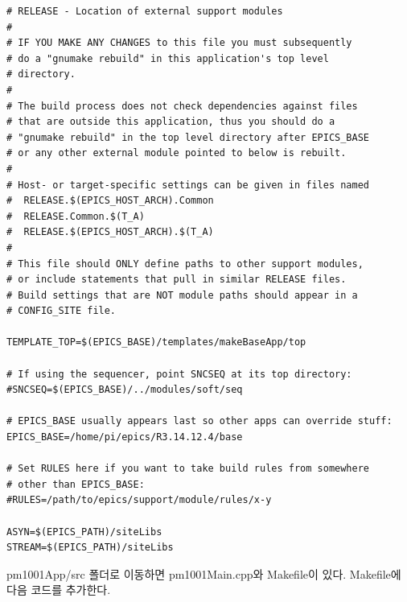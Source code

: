\documentclass[11pt
  , a4paper
  , article
  , oneside
]{memoir}
\begin{document}
\begin{lstlisting}[style=termstyle]
# RELEASE - Location of external support modules
#
# IF YOU MAKE ANY CHANGES to this file you must subsequently
# do a "gnumake rebuild" in this application's top level
# directory.
#
# The build process does not check dependencies against files
# that are outside this application, thus you should do a
# "gnumake rebuild" in the top level directory after EPICS_BASE
# or any other external module pointed to below is rebuilt.
#
# Host- or target-specific settings can be given in files named
#  RELEASE.$(EPICS_HOST_ARCH).Common
#  RELEASE.Common.$(T_A)
#  RELEASE.$(EPICS_HOST_ARCH).$(T_A)
#
# This file should ONLY define paths to other support modules,
# or include statements that pull in similar RELEASE files.
# Build settings that are NOT module paths should appear in a
# CONFIG_SITE file.

TEMPLATE_TOP=$(EPICS_BASE)/templates/makeBaseApp/top

# If using the sequencer, point SNCSEQ at its top directory:
#SNCSEQ=$(EPICS_BASE)/../modules/soft/seq

# EPICS_BASE usually appears last so other apps can override stuff:
EPICS_BASE=/home/pi/epics/R3.14.12.4/base

# Set RULES here if you want to take build rules from somewhere
# other than EPICS_BASE:
#RULES=/path/to/epics/support/module/rules/x-y

ASYN=$(EPICS_PATH)/siteLibs
STREAM=$(EPICS_PATH)/siteLibs
\end{lstlisting}
pm1001App/src 폴더로 이동하면 pm1001Main.cpp와 Makefile이 있다. Makefile에 다음 코드를 추가한다.
\end{document}
